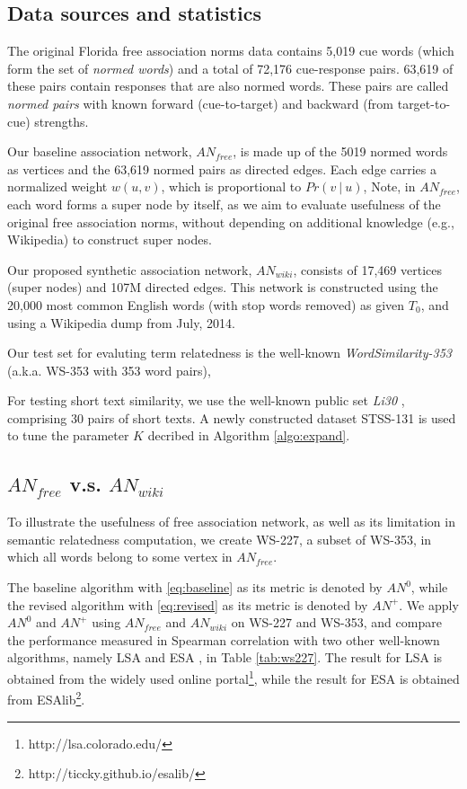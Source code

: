 \documentclass[letterpaper]{article}
\newcommand{\tabref}[1]{Table \ref{#1}}
\begin{document}
\subsection{Data sources and statistics}
\label{sec:statistics}

The original Florida free association norms data
contains 5,019 cue words (which form the set of {\em normed words})
and a total of 72,176 cue-response pairs.
63,619 of these pairs contain responses that are also normed words.
These pairs are called {\em normed pairs} 
with known forward (cue-to-target) and backward (from target-to-cue) strengths.

Our baseline association network, $AN_{free}$, is made up of the 5019
normed words as vertices and the 63,619 normed pairs as directed edges.
Each edge carries a normalized weight $w(u, v)$, which is
proportional to $Pr(v ~|~ u)$,
Note, in $AN_{free}$, each word forms a super node by itself, as we aim to
evaluate usefulness of the original free association norms, without
depending on additional knowledge (e.g., Wikipedia) to construct super nodes.

Our proposed synthetic association network, $AN_{wiki}$, consists of 17,469
vertices (super nodes) and 107M directed edges.
This network is constructed using the 20,000 most
common English words (with stop words removed) as given $T_0$, and using
a Wikipedia dump from July, 2014.

Our test set for evaluting term relatedness is the well-known
{\em WordSimilarity-353} \cite{WS353} (a.k.a. WS-353 with 353 word pairs), 

For testing short text similarity, we use the well-known public set
{\em Li30} \cite{li06}, comprising 30 pairs of short texts. A newly constructed dataset
STSS-131 \cite{STSS131} is used to tune the parameter $K$ decribed in
Algorithm \ref{algo:expand}.


\subsection{$AN_{free}$ v.s. $AN_{wiki}$}
\label{sec:free}
To illustrate the usefulness of free association network, as well as
its limitation in semantic relatedness computation, we create WS-227,
a subset of WS-353, in which all words belong to some vertex in
$AN_{free}$.

The baseline algorithm with \eqref{eq:baseline} as its metric 
is denoted by $AN^0$, while the revised algorithm with \eqref{eq:revised} as its metric is denoted by $AN^+$.
We apply $AN^0$ and $AN^+$
using $AN_{free}$ and $AN_{wiki}$ on WS-227 and WS-353, and compare the performance measured in Spearman
correlation with two other well-known algorithms, namely
LSA \cite{LSA} and ESA \cite{ESA}, in \tabref{tab:ws227}. The result
for LSA is obtained from the widely used online
portal\footnote{http://lsa.colorado.edu/}, while the result for ESA is obtained from
ESAlib\footnote{http://ticcky.github.io/esalib/}.
\end{document}
